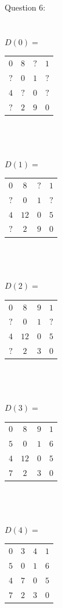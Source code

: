\documentclass[12pt]{article}
\begin{document}
Question 6:\\\\\\
$D(0) = $
\begin{tabular}{|cccc|}
\hline
$0$ & $8$ & $?$ & $1$\\
$?$ & $0$ & $1$ & $?$\\
$4$ & $?$ & $0$ & $?$\\
$?$ & $2$ & $9$ & $0$\\
\hline
\end{tabular}\\\\\\
$D(1) = $
\begin{tabular}{|cccc|}
\hline
$0$ & $8$ & $?$ & $1$\\
$?$ & $0$ & $1$ & $?$\\
$4$ & $12$ & $0$ & $5$\\
$?$ & $2$ & $9$ & $0$\\
\hline
\end{tabular}\\\\\\
$D(2) = $
\begin{tabular}{|cccc|}
\hline
$0$ & $8$ & $9$ & $1$\\
$?$ & $0$ & $1$ & $?$\\
$4$ & $12$ & $0$ & $5$\\
$?$ & $2$ & $3$ & $0$\\
\hline
\end{tabular}\\\\\\
$D(3) = $
\begin{tabular}{|cccc|}
\hline
$0$ & $8$ & $9$ & $1$\\
$5$ & $0$ & $1$ & $6$\\
$4$ & $12$ & $0$ & $5$\\
$7$ & $2$ & $3$ & $0$\\
\hline
\end{tabular}\\\\\\
$D(4) = $
\begin{tabular}{|cccc|}
\hline
$0$ & $3$ & $4$ & $1$\\
$5$ & $0$ & $1$ & $6$\\
$4$ & $7$ & $0$ & $5$\\
$7$ & $2$ & $3$ & $0$\\
\hline
\end{tabular}\\\\\\
\end{document}
